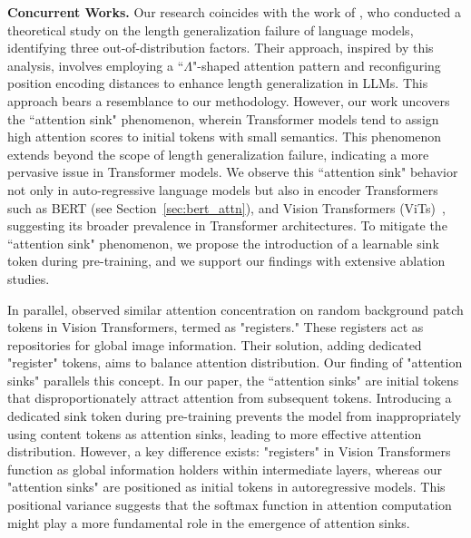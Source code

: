 \textbf{Concurrent Works.} Our research coincides with the work of \citeauthor{han2023lminfinite}, who conducted a theoretical study on the length generalization failure of language models, identifying three out-of-distribution factors. Their approach, inspired by this analysis, involves employing a ``$\Lambda$"-shaped attention pattern and reconfiguring position encoding distances to enhance length generalization in LLMs. This approach bears a resemblance to our methodology. However, our work uncovers the ``attention sink" phenomenon, wherein Transformer models tend to assign high attention scores to initial tokens with small semantics. This phenomenon extends beyond the scope of length generalization failure, indicating a more pervasive issue in Transformer models. We observe this ``attention sink" behavior not only in auto-regressive language models but also in encoder Transformers such as BERT (see Section~\ref{sec:bert_attn}), and Vision Transformers (ViTs)~\citep{Darcet2023Registers}, suggesting its broader prevalence in Transformer architectures. To mitigate the ``attention sink" phenomenon, we propose the introduction of a learnable sink token during pre-training, and we support our findings with extensive ablation studies. 

In parallel, \citeauthor{Darcet2023Registers} observed similar attention concentration on random background patch tokens in Vision Transformers, termed as "registers." These registers act as repositories for global image information. Their solution, adding dedicated "register" tokens, aims to balance attention distribution. Our finding of "attention sinks" parallels this concept. In our paper, the ``attention sinks" are initial tokens that disproportionately attract attention from subsequent tokens. Introducing a dedicated sink token during pre-training prevents the model from inappropriately using content tokens as attention sinks, leading to more effective attention distribution. However, a key difference exists: "registers" in Vision Transformers function as global information holders within intermediate layers, whereas our "attention sinks" are positioned as initial tokens in autoregressive models. This positional variance suggests that the softmax function in attention computation might play a more fundamental role in the emergence of attention sinks.


